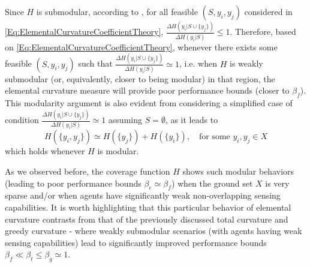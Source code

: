\documentclass[letterpaper, 10 pt, conference]{ieeeconf}
\begin{document}
Since $H$ is submodular, according to  \cite[Prop. 2.1]{Nemhauser1978}, for all feasible $(S,y_i,y_j)$ considered in \eqref{Eq:ElementalCurvatureCoefficientTheory}, $\frac{\Delta H(y_i \vert S \cup \{y_j\})}{\Delta H(y_i \vert S)} \leq 1$. Therefore, based on \eqref{Eq:ElementalCurvatureCoefficientTheory}, whenever there exists some feasible $(S,y_i,y_j)$ such that  $\frac{\Delta H(y_i \vert S \cup \{y_j\})}{\Delta H(y_i \vert S)} \simeq 1$, i.e. when $H$ is weakly submodular (or, equivalently, closer to being modular) in that region, the elemental curvature measure will provide poor performance bounds (closer to $\beta_f$). This modularity argument is also evident from considering a simplified case of condition $\frac{\Delta H(y_i \vert S \cup \{y_j\})}{\Delta H(y_i \vert S)} \simeq 1$ assuming $S=\emptyset$, as it leads to
$$
H(\{y_i,y_j\}) \simeq H(\{y_j\}) + H(\{y_i\}), \quad \mbox{for some } y_i,y_j\in X
$$
which holds whenever $H$ is modular.

As we observed before, the coverage function $H$ shows such modular behaviors (leading to poor performance bounds $\beta_e\simeq \beta_f$) when the ground set $X$ is very sparse and/or when agents have significantly weak non-overlapping sensing capabilities. It is worth highlighting that this particular behavior of elemental curvature contrasts from that of the previously discussed total curvature and greedy curvature - where weakly submodular scenarios (with agents having weak sensing capabilities) lead to significantly improved performance bounds $\beta_f \ll \beta_t \leq \beta_g \simeq 1$.
\end{document}
